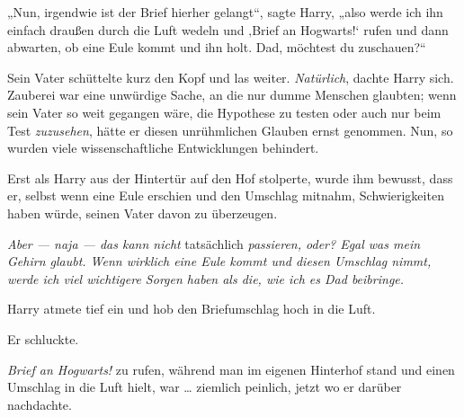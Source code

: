„Nun, irgendwie ist der Brief hierher gelangt“, sagte Harry, „also werde ich ihn einfach draußen durch die Luft wedeln und ‚Brief an Hogwarts!‘ rufen und dann abwarten, ob eine Eule kommt und ihn holt. Dad, möchtest du zuschauen?“

Sein Vater schüttelte kurz den Kopf und las weiter. \emph{Natürlich}, dachte Harry sich. Zauberei war eine unwürdige Sache, an die nur dumme Menschen glaubten; wenn sein Vater so weit gegangen wäre, die Hypothese zu testen oder auch nur beim Test \emph{zuzusehen}, hätte er diesen unrühmlichen Glauben ernst genommen. Nun, so wurden viele wissenschaftliche Entwicklungen behindert.

Erst als Harry aus der Hintertür auf den Hof stolperte, wurde ihm bewusst, dass er, selbst wenn eine Eule erschien und den Umschlag mitnahm, Schwierigkeiten haben würde, seinen Vater davon zu überzeugen.

\emph{Aber — naja — das kann nicht} tatsächlich \emph{passieren, oder? Egal was mein Gehirn glaubt. Wenn wirklich eine Eule kommt und diesen Umschlag nimmt, werde ich viel wichtigere Sorgen haben als die, wie ich es Dad beibringe.}

Harry atmete tief ein und hob den Briefumschlag hoch in die Luft.

Er schluckte.

\emph{Brief an Hogwarts!} zu rufen, während man im eigenen Hinterhof stand und einen Umschlag in die Luft hielt, war … ziemlich peinlich, jetzt wo er darüber nachdachte.


